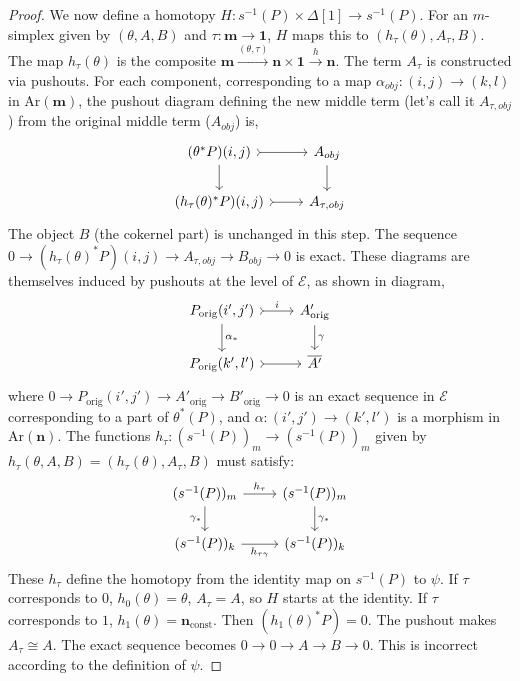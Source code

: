 \documentclass[12pt]{report}
\numberwithin{equation}{section}
\begin{document}
\begin{proof}
	We now define a homotopy $H : s^{-1}(P) \times \Delta[1] \to s^{-1}(P)$.
	For an $m$-simplex given by $(\theta, A, B)$ and $\tau: \mathbf{m} \to \mathbf{1}$, $H$ maps this to $(h_\tau(\theta), A_\tau, B)$.
	The map $h_\tau(\theta)$ is the composite $\mathbf{m} \xrightarrow{(\theta,\tau)} \mathbf{n} \times \mathbf{1} \xrightarrow{h} \mathbf{n}$.
	The term $A_\tau$ is constructed via pushouts. For each component, corresponding to a map $\alpha_{obj}: (i,j) \to (k,l)$ in $\mathrm{Ar}(\mathbf{m})$, the pushout diagram defining the new middle term (let's call it $A_{\tau, obj}$) from the original middle term ($A_{obj}$) is,
\[\begin{tikzcd}
	{(\theta^*P)(i,j)} & {A_{obj}} \\
	{(h_\tau(\theta)^*P)(i,j)} & {A_{\tau,obj}}
	\arrow[tail, from=1-1, to=1-2]
	\arrow[from=1-1, to=2-1]
	\arrow[from=1-2, to=2-2]
	\arrow[tail, from=2-1, to=2-2]
\end{tikzcd}\]
	The object $B$ (the cokernel part) is unchanged in this step.
	The sequence $0 \to (h_\tau(\theta)^*P)(i,j) \to A_{\tau, obj} \to B_{obj} \to 0$ is exact.
	These diagrams are themselves induced by pushouts at the level of $\mathcal{E}$, as shown in diagram,
\[\begin{tikzcd}
	{P_{\text{orig}}(i',j')} & {A'_{\mathrm{orig}}} \\
	{P_{\text{orig}}(k',l')} & {\overline{A'}}
	\arrow["i", tail, from=1-1, to=1-2]
	\arrow["{\alpha_*}", from=1-1, to=2-1]
	\arrow["\gamma", from=1-2, to=2-2]
	\arrow[tail, from=2-1, to=2-2]
\end{tikzcd}\]
	where $0 \to P_{\text{orig}}(i',j') \to A'_{\text{orig}} \to B'_{\text{orig}} \to 0$ is an exact sequence in $\mathcal{E}$ corresponding to a part of $\theta^*(P)$, and $\alpha: (i',j') \to (k',l')$ is a morphism in $\mathrm{Ar}(\mathbf{n})$.
	The functions $h_\tau : (s^{-1}(P))_m \to (s^{-1}(P))_m$ given by $h_\tau(\theta, A, B) = (h_\tau(\theta), A_\tau, B)$ must satisfy:
	\[
	\begin{tikzcd}
		(s^{-1}(P))_m \arrow[r, "h_\tau"] \arrow[d, "\gamma_*"'] & (s^{-1}(P))_m \arrow[d, "\gamma_*"] \\
		(s^{-1}(P))_k \arrow[r, "h_{\tau\gamma}"'] & (s^{-1}(P))_k
	\end{tikzcd}
	\]
	These $h_\tau$ define the homotopy from the identity map on $s^{-1}(P)$ to $\psi$.
	If $\tau$ corresponds to $0$, $h_0(\theta) = \theta$, $A_\tau = A$, so $H$ starts at the identity.
	If $\tau$ corresponds to $1$, $h_1(\theta) = \mathbf{n}_{\text{const}}$. Then $(h_1(\theta)^*P)=0$. The pushout makes $A_\tau \cong A$. The exact sequence becomes $0 \to 0 \to A \to B \to 0$. This is incorrect according to the definition of $\psi$.
	

\end{proof}
\end{document}
